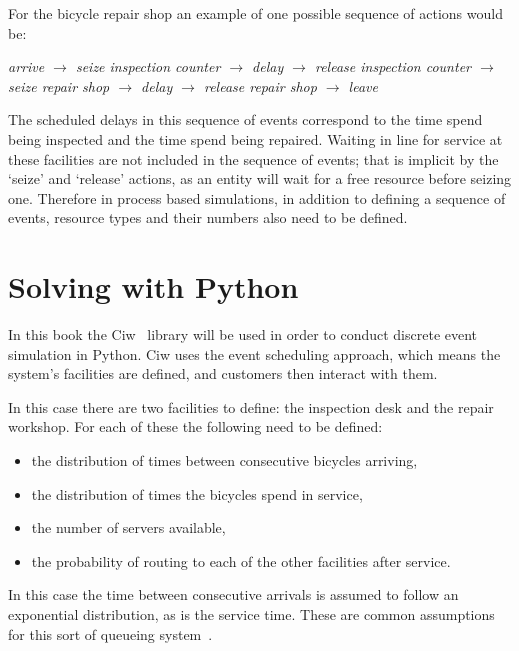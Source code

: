 For the bicycle repair shop an example of one possible sequence of actions would
be:

\textit{arrive
        \(\rightarrow\)
        seize inspection counter
        \(\rightarrow\)
        delay
        \(\rightarrow\)
        release inspection counter
        \(\rightarrow\)
        seize repair shop
        \(\rightarrow\)
        delay
        \(\rightarrow\)
        release repair shop
        \(\rightarrow\)
        leave
        }

The scheduled delays in this sequence of events correspond to the time spend
being inspected and the time spend being repaired. Waiting in line for service
at these facilities are not included in the sequence of events; that is implicit
by the `seize' and `release' actions, as an entity will wait for a free resource
before seizing one.
Therefore in process based simulations, in addition to defining a sequence of
events, resource types and their numbers also need to be defined.


\section{Solving with Python}\label{sec:discrete_event_simulation_solving-with-python}

In this book the Ciw~\cite{ciwpython, palmer2019ciw}
library will be used in order to conduct discrete event
simulation in Python.
Ciw uses the event scheduling approach, which means the system's
facilities are defined, and customers then interact with them.

In this case there are two facilities to define: the inspection desk and the
repair workshop. For each of these the following need to be defined:

\begin{itemize}
  \item the distribution of times between consecutive bicycles arriving,
  \item the distribution of times the bicycles spend in service,
  \item the number of servers available,
  \item the probability of routing to each of the other facilities after
  service.
\end{itemize}

In this case the time between consecutive arrivals is assumed to follow an
exponential distribution, as is the service time.
These are common assumptions for this sort of queueing system~\cite{stewart2009probability}.

